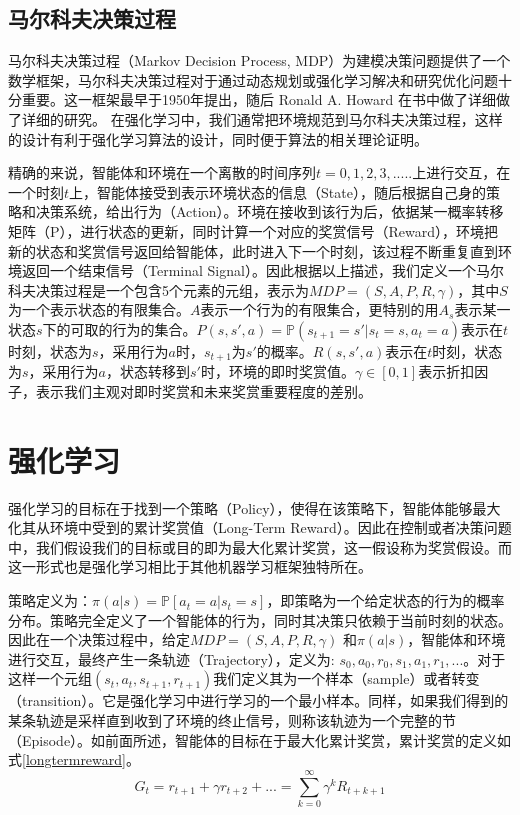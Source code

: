 \documentclass{standalone}
\begin{document}
\subsection{马尔科夫决策过程}
马尔科夫决策过程（Markov Decision Process, MDP）为建模决策问题提供了一个数学框架，马尔科夫决策过程对于通过动态规划或强化学习解决和研究优化问题十分重要。这一框架最早于1950年提出，随后 Ronald A. Howard 在书中做了详细做了详细的研究。
在强化学习中，我们通常把环境规范到马尔科夫决策过程，这样的设计有利于强化学习算法的设计，同时便于算法的相关理论证明。\par
精确的来说，智能体和环境在一个离散的时间序列$t=0,1,2,3,... ..$上进行交互，在一个时刻$t$上，智能体接受到表示环境状态的信息（State），随后根据自己身的策略和决策系统，给出行为（Action）。环境在接收到该行为后，依据某一概率转移矩阵（P），进行状态的更新，同时计算一个对应的奖赏信号（Reward），环境把新的状态和奖赏信号返回给智能体，此时进入下一个时刻，该过程不断重复直到环境返回一个结束信号（Terminal Signal）。因此根据以上描述，我们定义一个马尔科夫决策过程是一个包含5个元素的元组，表示为$MDP=(S, A, P, R, \gamma)$，其中$S$为一个表示状态的有限集合。$A$表示一个行为的有限集合，更特别的用$A_s$表示某一状态$s$下的可取的行为的集合。$P(s, s',a) = \mathbb{P}(s_{t+1} = s'|s_t = s, a_t=a)$表示在$t$时刻，状态为$s$，采用行为$a$时，$s_{t+1}$为$s'$的概率。$R(s, s', a)$表示在$t$时刻，状态为$s$，采用行为$a$，状态转移到$s'$时，环境的即时奖赏值。$\gamma \in [0, 1]$表示折扣因子，表示我们主观对即时奖赏和未来奖赏重要程度的差别。\par 

\section{强化学习}
强化学习的目标在于找到一个策略（Policy），使得在该策略下，智能体能够最大化其从环境中受到的累计奖赏值（Long-Term Reward）。因此在控制或者决策问题中，我们假设我们的目标或目的即为最大化累计奖赏，这一假设称为奖赏假设。而这一形式也是强化学习相比于其他机器学习框架独特所在。\par
策略定义为：$\pi(a|s) = \mathbb{P}[a_t=a | s_t=s]$，即策略为一个给定状态的行为的概率分布。策略完全定义了一个智能体的行为，同时其决策只依赖于当前时刻的状态。
因此在一个决策过程中，给定$MDP=(S, A, P, R, \gamma)$ 和$\pi(a|s)$，智能体和环境进行交互，最终产生一条轨迹（Trajectory），定义为: $s_0, a_0, r_0, s_1, a_1, r_1, ...$。对于这样一个元组$(s_t, a_t, s_{t+1}, r_{t+1})$我们定义其为一个样本（sample）或者转变（transition）。它是强化学习中进行学习的一个最小样本。同样，如果我们得到的某条轨迹是采样直到收到了环境的终止信号，则称该轨迹为一个完整的节（Episode）。如前面所述，智能体的目标在于最大化累计奖赏，累计奖赏的定义如式\ref{longtermreward}。
    \begin{equation}
    \label{longtermreward}
        G_t=r_{t+1} + \gamma r_{t+2}+... = \sum_{k=0}^{\infty}\gamma^{k}R_{t+k+1}
    \end{equation}
\end{document}
